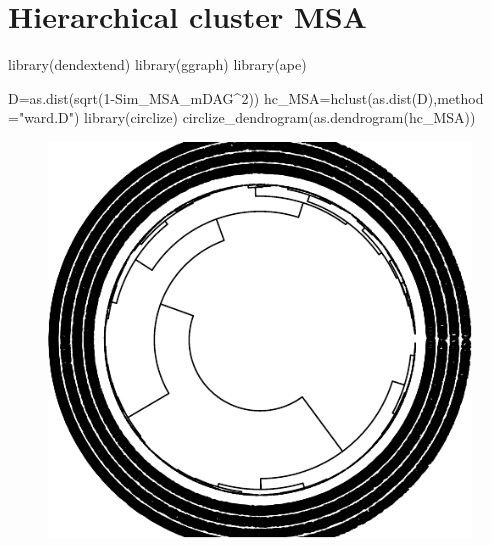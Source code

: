 \documentclass[
  letterpaper,
  DIV=11,
  numbers=noendperiod]{scrreprt}
\newenvironment{Shaded}{}{}
\newcommand{\AttributeTok}[1]{\textcolor[rgb]{0.78,0.47,0.87}{#1}}
\newcommand{\DecValTok}[1]{\textcolor[rgb]{0.82,0.60,0.40}{#1}}
\newcommand{\FunctionTok}[1]{\textcolor[rgb]{0.38,0.69,0.94}{#1}}
\newcommand{\NormalTok}[1]{\textcolor[rgb]{0.67,0.70,0.75}{#1}}
\newcommand{\OtherTok}[1]{\textcolor[rgb]{0.15,0.68,0.38}{#1}}
\newcommand{\SpecialCharTok}[1]{\textcolor[rgb]{0.34,0.71,0.76}{#1}}
\newcommand{\StringTok}[1]{\textcolor[rgb]{0.60,0.76,0.47}{#1}}
\begin{document}

\hypertarget{hierarchical-cluster-msa}{%
\chapter{Hierarchical cluster MSA}\label{hierarchical-cluster-msa}}

\begin{Shaded}
\begin{Highlighting}[]
\FunctionTok{library}\NormalTok{(dendextend)}
\FunctionTok{library}\NormalTok{(ggraph)}
\FunctionTok{library}\NormalTok{(ape)}

\NormalTok{D}\OtherTok{=}\FunctionTok{as.dist}\NormalTok{(}\FunctionTok{sqrt}\NormalTok{(}\DecValTok{1}\SpecialCharTok{{-}}\NormalTok{Sim\_MSA\_mDAG}\SpecialCharTok{\^{}}\DecValTok{2}\NormalTok{))}
\NormalTok{hc\_MSA}\OtherTok{=}\FunctionTok{hclust}\NormalTok{(}\FunctionTok{as.dist}\NormalTok{(D),}\AttributeTok{method =}\StringTok{"ward.D"}\NormalTok{)}
\FunctionTok{library}\NormalTok{(circlize)}
\FunctionTok{circlize\_dendrogram}\NormalTok{(}\FunctionTok{as.dendrogram}\NormalTok{(hc\_MSA))}
\end{Highlighting}
\end{Shaded}

\begin{figure}[H]

{\centering \includegraphics[width=1\textwidth,height=\textheight]{index_files/figure-pdf/unnamed-chunk-35-1.pdf}

}

\end{figure}
\end{document}
